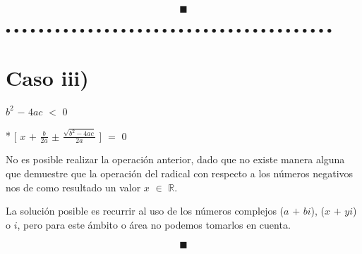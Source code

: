 \documentclass[12pt]{article}
\renewcommand{\qedsymbol}{$\blacksquare$}
\newenvironment{MyColorPar}[1]{%
    \leavevmode\color{#1}\ignorespaces%
}{%
}%
\begin{document}
\hspace{3.5cm} $\qedsymbol$

\newpage

\begin{MyColorPar}{pakistangreen}
$\bullet$ $\bullet$ $\bullet$ $\bullet$ $\bullet$ $\bullet$ $\bullet$ $\bullet$ $\bullet$ $\bullet$ $\bullet$ $\bullet$ $\bullet$ $\bullet$ $\bullet$ $\bullet$ $\bullet$ $\bullet$ $\bullet$ $\bullet$ $\bullet$ $\bullet$ $\bullet$ $\bullet$ $\bullet$ $\bullet$ $\bullet$ $\bullet$ $\bullet$ $\bullet$ $\bullet$ $\bullet$ $\bullet$ $\bullet$ $\bullet$ $\bullet$ $\bullet$ $\bullet$ $\bullet$ $\bullet$ 
\end{MyColorPar} 


\vspace{0.5cm}
\section*{{\textsf{Caso iii)}}}
\hspace{4cm} {\Large{$b^{2}$ $-$ $4ac$ $<$ $0$}} \vspace{0.5cm}

\hspace{3cm} * $\bigg [$ $x$ $+$ {\LARGE{$\frac{b}{2a}$}} $\pm$ {\LARGE{$\frac{\sqrt{b^{2}-4ac}}{2a}$}} $\bigg ]$ $=$ $0$ \vspace{0.5cm}

No es posible realizar la operación anterior, dado que no existe manera alguna que demuestre que la operación del radical con respecto a los números negativos nos de como resultado un valor $x$ $\in$ $\mathbb{R}$.

La solución posible es recurrir al uso de los números complejos ($a$ $+$ $bi$), ($x$ $+$ $yi$) o $i$, pero para este ámbito o área no podemos tomarlos en cuenta. 

\hspace{13cm} $\qedsymbol$
\end{document}
